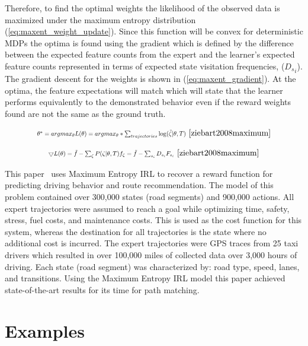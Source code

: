 \documentclass[12pt,american]{report}
\begin{document}
Therefore, to find the optimal weights the likelihood of the observed data is maximized under the maximum entropy distribution (\ref{eq:maxent_weight_update}). Since this function will be convex for deterministic MDPs the optima is found using the gradient  which is defined by the difference between the expected feature counts from the expert and the learner's expected feature counts represented in terms of expected state visitation frequencies, (${{}D_s}_{i}$).  The gradient descent for the weights is shown in (\ref{eq:maxent_gradient}). At the optima, the feature expectations will match which will state that the learner performs equivalently to the demonstrated behavior even if the reward weights found are not the same as the ground truth.

\begin{equation}
            \label{eq:maxent_weight_update}
            \resizebox{0.52\textwidth}{!}{$\theta^* = argmax_\theta L(\theta) = argmax_\theta * \sum_{trajectories}^{}\log(\tilde\zeta|\theta,T)$}~\cite{ziebart2008maximum}%
        \end{equation}

\begin{equation}
            \label{eq:maxent_gradient}
            \resizebox{0.44\textwidth}{!}{$\bigtriangledown L(\theta) = \tilde f - \sum_{\zeta}^{} P(\zeta|\theta,T)f_\zeta = \tilde f - \sum_{s_i}^{}D_{s_{i}}F_{s_{i}}$}~\cite{ziebart2008maximum}%
        \end{equation}

This paper~\cite{ziebart2008maximum} uses Maximum Entropy IRL to recover a reward function for predicting driving behavior and route recommendation. The model of this problem contained over 300,000 states (road segments) and 900,000 actions. All expert trajectories were assumed to reach a goal while optimizing time, safety, stress, fuel costs, and maintenance costs. This is used as the cost function for this system, whereas the destination for all trajectories is the state where no additional cost is incurred. The expert trajectories were GPS traces from 25 taxi drivers which resulted in over 100,000 miles of collected data over 3,000 hours of driving. Each state (road segment) was characterized by: road type, speed, lanes, and transitions. Using the Maximum Entropy IRL model this paper achieved state-of-the-art results for its time for path matching.

\section{Examples}
\end{document}
